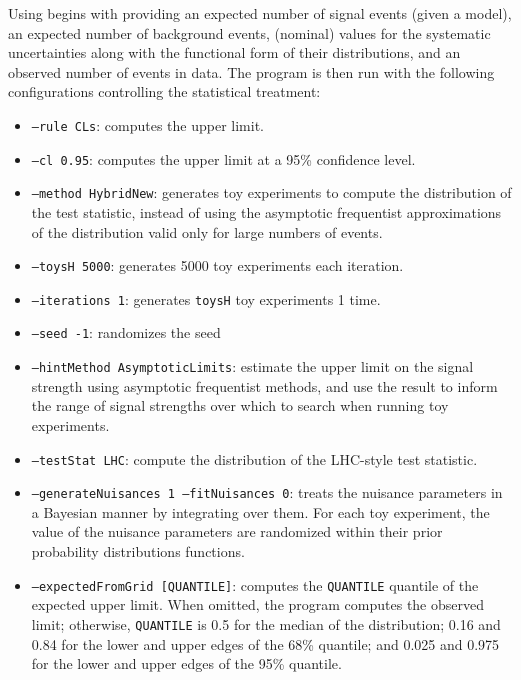 Using \combine begins with providing an expected number of signal events (given a model), an expected number of background events, (nominal) values for the systematic uncertainties along with the functional form of their distributions, and an observed number of events in data.
The \combine program is then run with the following configurations controlling the statistical treatment:
\begin{itemize}
  \item \texttt{--rule CLs}: computes the \CLs upper limit.
  \item \texttt{--cl 0.95}: computes the upper limit at a 95\% confidence level.
  \item \texttt{--method HybridNew}: generates toy experiments to compute the distribution of the test statistic, instead of using the asymptotic frequentist approximations of the distribution valid only for large numbers of events.
  \item \texttt{--toysH 5000}: generates 5000 toy experiments each iteration.
  \item \texttt{--iterations 1}: generates \texttt{toysH} toy experiments 1 time.
  \item \texttt{--seed -1}: randomizes the seed
  \item \texttt{--hintMethod AsymptoticLimits}: estimate the upper limit on the signal strength using asymptotic frequentist methods, and use the result to inform the range of signal strengths over which to search when running toy experiments.
  \item \texttt{--testStat LHC}: compute the distribution of the LHC-style test statistic.
  \item \texttt{--generateNuisances 1 --fitNuisances 0}: treats the nuisance parameters in a Bayesian manner by integrating over them. For each toy experiment, the value of the nuisance parameters are randomized within their prior probability distributions functions.
  \item \texttt{--expectedFromGrid [QUANTILE]}: computes the \texttt{QUANTILE} quantile of the expected upper limit. When omitted, the program computes the observed limit; otherwise, \texttt{QUANTILE} is 0.5 for the median of the distribution; 0.16 and 0.84 for the lower and upper edges of the 68\% quantile; and 0.025 and 0.975 for the lower and upper edges of the 95\% quantile. 
\end{itemize}

